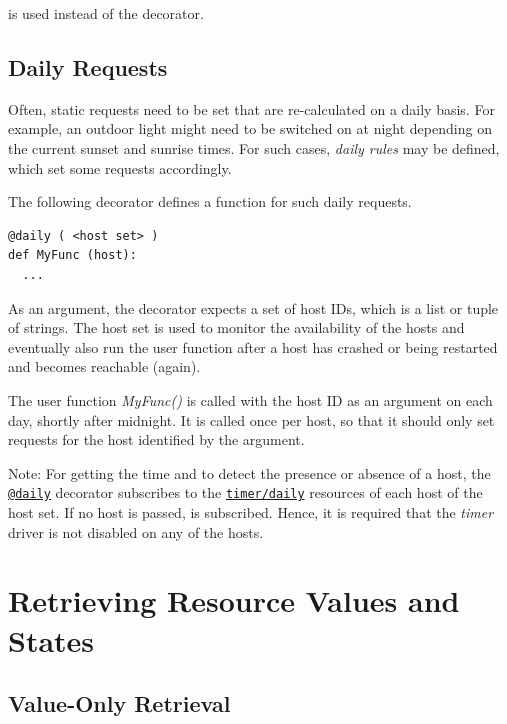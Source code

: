 \documentclass[12pt,english,parskip=half,headheight=19pt]{scrreprt}
\newcommand{\refrc}[1]{\hyperref[rc:#1]{\texttt{#1}}}
\newcommand{\refapipython}[1]{\href{home2l-api_python/index.html}{\mbox{\texttt{#1}}}}  %
\begin{document}
is used instead of the decorator.



\subsection{Daily Requests}

Often, static requests need to be set that are re-calculated on a daily basis. For example, an outdoor light might need to be switched on at night depending on the current sunset and sunrise times. For such cases, \textit{daily rules} may be defined, which set some requests accordingly.

The following decorator defines a function for such daily requests.
\begin{lstlisting}
@daily ( <host set> )
def MyFunc (host):
  ...
\end{lstlisting}

As an argument, the decorator expects a set of host IDs, which is a list or tuple of strings. The host set is used to monitor the availability of the hosts and eventually also run the user function after a host has crashed or being restarted and becomes reachable (again).

The user function \textit{MyFunc()} is called with the host ID as an argument on each day, shortly after midnight. It is called once per host, so that it should only set requests for the host identified by the argument.

Note: For getting the time and to detect the presence or absence of a host, the \refapipython{@daily} decorator subscribes to the \refrc{timer/daily} resources of each host of the host set. If no host is passed,  is subscribed. Hence, it is required that the \textit{timer} driver is not disabled on any of the hosts.





\section{Retrieving Resource Values and States}
\label{sec:rules-values}



\subsection{Value-Only Retrieval}
\end{document}

